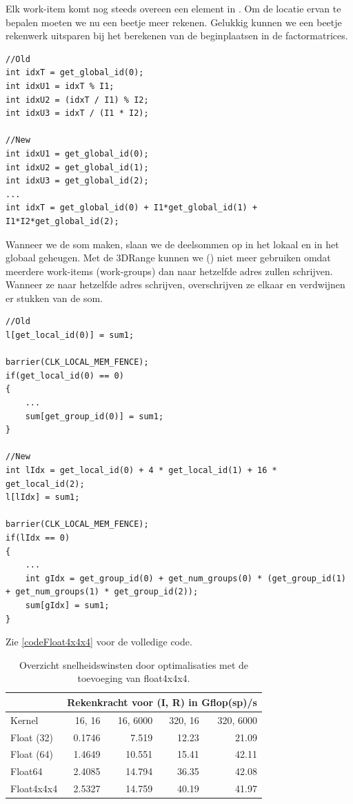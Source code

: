 Elk work-item komt nog steeds overeen een element in \TT{}. Om de locatie ervan te bepalen moeten we nu een beetje meer rekenen. Gelukkig kunnen we een beetje rekenwerk uitsparen bij het berekenen van de beginplaatsen in de factormatrices.
\begin{lstlisting}
//Old
int idxT = get_global_id(0);
int idxU1 = idxT % I1;
int idxU2 = (idxT / I1) % I2;
int idxU3 = idxT / (I1 * I2);

//New
int idxU1 = get_global_id(0);
int idxU2 = get_global_id(1);
int idxU3 = get_global_id(2);
...
int idxT = get_global_id(0) + I1*get_global_id(1) + I1*I2*get_global_id(2);
\end{lstlisting}

Wanneer we de som maken, slaan we de deelsommen op in het lokaal en in het globaal geheugen. Met de 3DRange kunnen we () niet meer gebruiken omdat meerdere work-items (work-groups) dan naar hetzelfde adres zullen schrijven. Wanneer ze naar hetzelfde adres schrijven, overschrijven ze elkaar en verdwijnen er stukken van de som.
\begin{lstlisting}
//Old
l[get_local_id(0)] = sum1;
	
barrier(CLK_LOCAL_MEM_FENCE);
if(get_local_id(0) == 0)
{        
	...
	sum[get_group_id(0)] = sum1;
}

//New
int lIdx = get_local_id(0) + 4 * get_local_id(1) + 16 * get_local_id(2);
l[lIdx] = sum1;

barrier(CLK_LOCAL_MEM_FENCE);
if(lIdx == 0)
{        
	...
	int gIdx = get_group_id(0) + get_num_groups(0) * (get_group_id(1) + get_num_groups(1) * get_group_id(2));
	sum[gIdx] = sum1;
}
\end{lstlisting}


Zie \ref{codeFloat4x4x4} voor de volledige code.



\begin{table}
	\centering
    \begin{tabular}{|l| r|r| r |r|}
		\hline
						& \multicolumn{4}{c|}{Rekenkracht voor (I, R) in Gflop(sp)/s}\\
		\hline
		Kernel          & 16, 16 	& 16, 6000	& 320, 16	&  320, 6000 \\
		\hline
		Float (32)      & 0.1746  	& 7.519   	& 12.23 	& 21.09 	\\
		Float (64)      & 1.4649	& 10.551  	& 15.41  	& 42.11  	\\
		Float64         & 2.4085 	& 14.794  	& 36.35 	& 42.08 	\\
		Float4x4x4      & 2.5327  	& 14.759 	& 40.19 	& 41.97  	\\
		\hline
    \end{tabular}
    \caption{\label{measF4} Overzicht snelheidswinsten door optimalisaties met de toevoeging van float4x4x4.}
\end{table}


